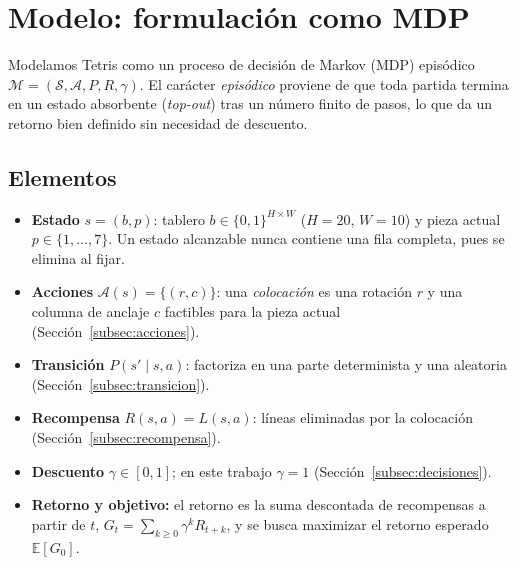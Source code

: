 \section{Modelo: formulación como MDP}
\label{sec:mdp}

Modelamos Tetris como un proceso de decisión de Markov (MDP) episódico
$\mathcal{M} = (\mathcal{S}, \mathcal{A}, P, R, \gamma)$. El carácter \emph{episódico} proviene de
que toda partida termina en un estado absorbente (\emph{top-out}) tras un número
finito de pasos, lo que da un retorno bien definido sin necesidad de descuento.

\subsection{Elementos}
\begin{itemize}[itemsep=2pt]
    \item \textbf{Estado} $s = (b, p)$: tablero $b \in \{0,1\}^{H\times W}$
          ($H=20$, $W=10$) y pieza actual $p \in \{1,\dots,7\}$. Un estado
          alcanzable nunca contiene una fila completa, pues se elimina al fijar.
    \item \textbf{Acciones} $\mathcal{A}(s) = \{(r,c)\}$: una \emph{colocación} es
          una rotación $r$ y una columna de anclaje $c$ factibles para la pieza
          actual (Sección~\ref{subsec:acciones}).
    \item \textbf{Transición} $P(s' \mid s, a)$: factoriza en una parte
          determinista y una aleatoria (Sección~\ref{subsec:transicion}).
    \item \textbf{Recompensa} $R(s, a) = L(s, a)$: líneas eliminadas por la
          colocación (Sección~\ref{subsec:recompensa}).
    \item \textbf{Descuento} $\gamma \in [0,1]$; en este trabajo $\gamma = 1$
          (Sección~\ref{subsec:decisiones}).
    \item \textbf{Retorno y objetivo:} el retorno es la suma descontada de
          recompensas a partir de $t$, $G_t = \sum_{k \ge 0} \gamma^{k} R_{t+k}$, y
          se busca maximizar el retorno esperado $\mathbb{E}[G_0]$.
\end{itemize}

